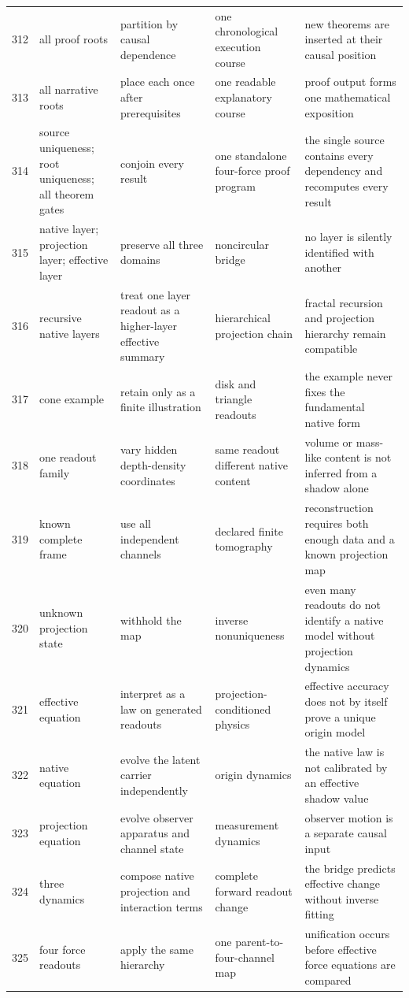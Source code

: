 \documentclass[11pt]{article}
\numberwithin{equation}{section}
\theoremstyle{remark}
\begin{document}
\begin{landscape}
\begin{longtable}{p{0.65cm}p{3.5cm}p{4.0cm}p{4.0cm}p{4.6cm}}
312&all proof roots&partition by causal dependence&one chronological execution course&new theorems are inserted at their causal position\\
313&all narrative roots&place each once after prerequisites&one readable explanatory course&proof output forms one mathematical exposition\\
314&source uniqueness; root uniqueness; all theorem gates&conjoin every result&one standalone four-force proof program&the single source contains every dependency and recomputes every result\\
315&native layer; projection layer; effective layer&preserve all three domains&noncircular bridge&no layer is silently identified with another\\
316&recursive native layers&treat one layer readout as a higher-layer effective summary&hierarchical projection chain&fractal recursion and projection hierarchy remain compatible\\
317&cone example&retain only as a finite illustration&disk and triangle readouts&the example never fixes the fundamental native form\\
318&one readout family&vary hidden depth-density coordinates&same readout different native content&volume or mass-like content is not inferred from a shadow alone\\
319&known complete frame&use all independent channels&declared finite tomography&reconstruction requires both enough data and a known projection map\\
320&unknown projection state&withhold the map&inverse nonuniqueness&even many readouts do not identify a native model without projection dynamics\\
321&effective equation&interpret as a law on generated readouts&projection-conditioned physics&effective accuracy does not by itself prove a unique origin model\\
322&native equation&evolve the latent carrier independently&origin dynamics&the native law is not calibrated by an effective shadow value\\
323&projection equation&evolve observer apparatus and channel state&measurement dynamics&observer motion is a separate causal input\\
324&three dynamics&compose native projection and interaction terms&complete forward readout change&the bridge predicts effective change without inverse fitting\\
325&four force readouts&apply the same hierarchy&one parent-to-four-channel map&unification occurs before effective force equations are compared\\

\end{longtable}
\end{landscape}
\end{document}
